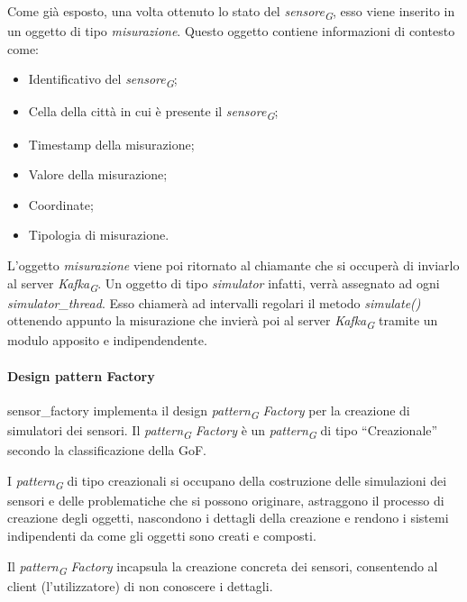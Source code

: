 Come già esposto, una volta ottenuto lo stato del \textit{sensore}\textsubscript{\textit{G}}, esso viene inserito in un oggetto di tipo \textit{misurazione}. Questo oggetto contiene informazioni di contesto come:
\begin{itemize}
    \item Identificativo del \textit{sensore}\textsubscript{\textit{G}};
    \item Cella della città in cui è presente il \textit{sensore}\textsubscript{\textit{G}};
    \item Timestamp della misurazione;
    \item Valore della misurazione;
    \item Coordinate;
    \item Tipologia di misurazione.
\end{itemize}

L'oggetto \textit{misurazione} viene poi ritornato al chiamante che si occuperà di inviarlo al server \textit{Kafka}\textsubscript{\textit{G}}.
Un oggetto di tipo \textit{simulator} infatti, verrà assegnato ad ogni \textit{simulator\_thread}. Esso chiamerà ad intervalli regolari il metodo \textit{simulate()} ottenendo appunto la misurazione che invierà poi al server \textit{Kafka}\textsubscript{\textit{G}} tramite un modulo apposito e indipendendente.

\paragraph{Design pattern Factory}
sensor\_factory implementa il design \textit{pattern}\textsubscript{\textit{G}} \textit{Factory} per la creazione di simulatori dei sensori.
Il \textit{pattern}\textsubscript{\textit{G}} \textit{Factory} è un \textit{pattern}\textsubscript{\textit{G}} di tipo “Creazionale” secondo la classificazione della GoF.

I \textit{pattern}\textsubscript{\textit{G}} di tipo creazionali si occupano della costruzione delle simulazioni dei sensori e delle problematiche che si possono originare, astraggono il processo di creazione degli oggetti, nascondono i dettagli della creazione e rendono i sistemi indipendenti da come gli oggetti sono creati e composti.

Il \textit{pattern}\textsubscript{\textit{G}} \textit{Factory} incapsula la creazione concreta dei sensori, consentendo al client
(l’utilizzatore) di non conoscere i dettagli.

